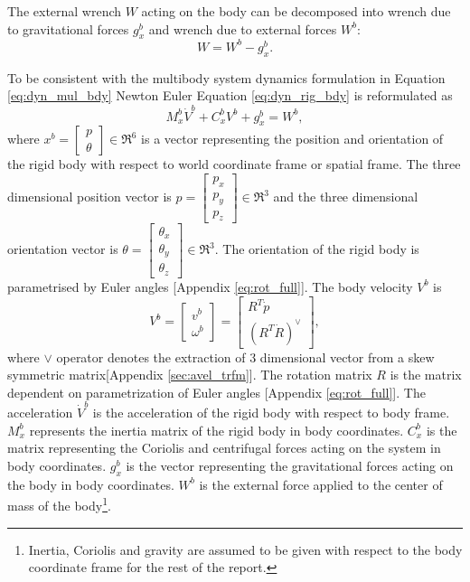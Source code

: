 The external wrench $W$ acting on the body can be decomposed into wrench due to gravitational forces $g_x^b$ and wrench due to external forces $W^b$: $$ W = W^b - g_x^b.$$

To be consistent with the multibody system dynamics formulation in Equation \ref{eq:dyn_mul_bdy} Newton Euler Equation \ref{eq:dyn_rig_bdy} is reformulated as
\begin{equation}
\label{eq:dyn_rig_bdy_sh}
M_x^b \dot V^b + C_x^b V^b+g_x^b = W^b,
\end{equation}
 where $x^b=\begin{bmatrix}p \\ \theta\end{bmatrix} \in \Re^6$ is a vector representing the position and orientation of the rigid body with respect to world coordinate frame or spatial frame. The three dimensional position vector is $p=\begin{bmatrix}p_x \\ p_y \\ p_z \end{bmatrix} \in \Re^3$ and the three dimensional orientation vector is $ \theta= \begin{bmatrix} \theta_{x} \\ \theta_{y} \\ \theta_{z} \end{bmatrix} \in \Re^3$. The orientation of the rigid body is parametrised by Euler angles [Appendix \ref{eq:rot_full}]. 
 The body velocity $V^b$ is 
 \begin{equation}
\label{eq:body_vel}
V^b =
\begin{bmatrix}
v^b \\ \omega^b
\end{bmatrix}
= \begin{bmatrix}
R^T \dot{p} \\ (R^T \dot{R})^\vee
\end{bmatrix},
\end{equation}
where $\vee$ operator denotes the extraction of 3 dimensional vector from a skew symmetric matrix[Appendix \ref{sec:avel_trfm}]. The rotation matrix $R$ is the matrix dependent on parametrization of Euler angles [Appendix \ref{eq:rot_full}]. The acceleration $\dot{V}^b$ is the acceleration of the rigid body with respect to body frame. $M_x^b$ represents the inertia matrix of the rigid body in body coordinates. $C_x^b$ is the matrix representing the Coriolis and centrifugal forces acting on the system in body coordinates. $g_x^b$ is the vector representing the gravitational forces acting on the body in body coordinates. $W^b$ is the external force applied to the center of mass of the body\footnote[2]{Inertia, Coriolis and gravity are assumed to be given with respect to the body coordinate frame for the rest of the report.}.

